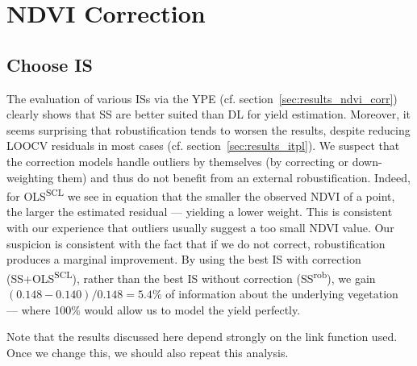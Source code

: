 \section{NDVI Correction}{\label{sec:discussion_corr}
    \subsection{Choose {{IS}}}\label{sec:discussion_iplfstrategy-choose}

    The evaluation of various ISs via the YPE (cf. section~\ref{sec:results_ndvi_corr}) clearly shows that SS are better suited than DL for yield estimation. Moreover, it seems surprising that robustification tends to worsen the results, despite reducing LOOCV residuals in most cases (cf. section~\ref{sec:results_itpl}). We suspect that the correction models handle outliers by themselves (by correcting or down-weighting them) and thus do not benefit from an external robustification. Indeed, for OLS\textsuperscript{SCL} we see in equation  that the smaller the observed NDVI of a point, the larger the estimated residual --- yielding a lower weight. This is consistent with our experience that outliers usually suggest a too small NDVI value. Our suspicion is consistent with the fact that if we do not correct, robustification produces a marginal improvement. 
    By using the best IS with correction (SS+OLS\textsuperscript{SCL}), rather than the best IS without correction (SS\textsuperscript{rob}), we gain $(0.148-0.140)/0.148 = 5.4\%$ of information about the underlying vegetation --- where 100\% would allow us to model the yield perfectly.
    
    Note that the results discussed here depend strongly on the link function used. Once we change this, we should also repeat this analysis.
            


}
